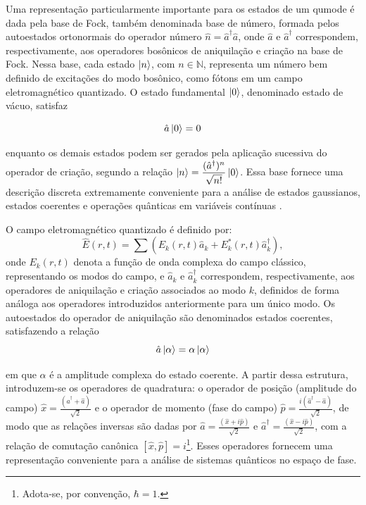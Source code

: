 Uma representação particularmente importante para os estados de um qumode é dada pela base de Fock, também denominada base de número, formada pelos autoestados ortonormais do operador número $\hat{n}=\hat{a}^{\dagger}\hat{a}$, onde $\hat{a}$ e $\hat{a}^{\dagger}$ correspondem, respectivamente, aos operadores bosônicos de aniquilação e criação na base de Fock. Nessa base, cada estado $\ket{n}$, com $n\in\mathbb{N}$, representa um número bem definido de excitações do modo bosônico, como fótons em um campo eletromagnético quantizado. O estado fundamental $\ket{0}$, denominado estado de vácuo, satisfaz

\begin{equation}
    \label{eq:vaccum_state}
    \hat{a}\ket{0}=0
\end{equation} 

\noindent enquanto os demais estados podem ser gerados pela aplicação sucessiva do operador de criação, segundo a relação $\ket{n}=\displaystyle\frac{(\hat{a}^{\dagger})^n}{\sqrt{n!}}\ket{0}$. Essa base fornece uma descrição discreta extremamente conveniente para a análise de estados gaussianos, estados coerentes e operações quânticas em variáveis contínuas \cite{serafini_quantum_2023}.

O campo eletromagnético quantizado é definido por:
\begin{equation}
    \hat{E}(r,t) = \sum \left( E_k(r,t)\hat{a}_k + E_k^{*}(r,t)\hat{a}_k^{\dagger} \right),
\end{equation}
onde $E_k(r,t)$ denota a função de onda complexa do campo clássico, representando os modos do campo,  e $\hat{a}_k$ e $\hat{a}_k^{\dagger}$ 
correspondem, respectivamente, aos operadores de aniquilação e criação 
associados ao modo $k$, definidos de forma análoga aos operadores 
introduzidos anteriormente para um único modo. Os autoestados do operador de aniquilação são denominados estados coerentes, satisfazendo a relação 
\begin{equation}
    \label{eq:coherent_states}
    \hat{a}\ket{\alpha} = \alpha \ket{\alpha}
\end{equation}

\noindent em que $\alpha$ é a amplitude complexa do estado coerente. A partir dessa estrutura, introduzem-se os operadores de quadratura: o operador de posição (amplitude do campo) $\displaystyle\hat{x} = \frac{(\hat{a}^{\dagger} + \hat{a})}{\sqrt{2}}$ e o operador de momento (fase do campo) $\displaystyle\hat{p} = \frac{i(\hat{a}^{\dagger} - \hat{a})}{\sqrt{2}}$, de modo que as relações inversas são dadas por $\displaystyle\hat{a} = \frac{(\hat{x} + i\hat{p})}{\sqrt{2}}$ e $\displaystyle\hat{a}^{\dagger} = \frac{(\hat{x} - i\hat{p})}{\sqrt{2}}$, com a relação de comutação canônica $[\hat{x},\hat{p}] = i$\footnote{Adota-se, por convenção, $\hbar = 1$.}. Esses operadores fornecem uma representação conveniente para a análise de sistemas quânticos no espaço de fase.


